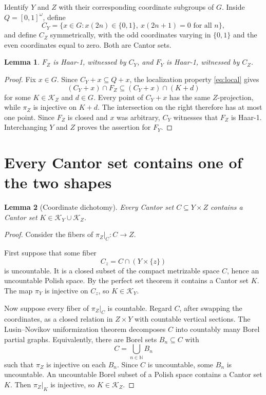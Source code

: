 \documentclass[11pt]{article}
\newtheorem{lemma}{Lemma}
\newcommand{\N}{\mathbb N}
\newcommand{\cK}{\mathscr K}
\begin{document}
Identify $Y$ and $Z$ with their corresponding coordinate subgroups of $G$.
Inside $Q=[0,1]^\omega$, define
\[
 C_Y=\{x\in G:x(2n)\in\{0,1\},\ x(2n+1)=0\text{ for all }n\},
\]
and define $C_Z$ symmetrically, with the odd coordinates varying in
$\{0,1\}$ and the even coordinates equal to zero.  Both are Cantor sets.

\begin{lemma}\label{lem:haar1}
$F_Z$ is Haar-1, witnessed by $C_Y$, and $F_Y$ is Haar-1, witnessed by $C_Z$.
\end{lemma}

\begin{proof}
Fix $x\in G$.  Since $C_Y+x\subseteq Q+x$, the localization property
\eqref{eq:local} gives
\[
 (C_Y+x)\cap F_Z\subseteq (C_Y+x)\cap(K+d)
\]
for some $K\in\cK_Z$ and $d\in G$.  Every point of $C_Y+x$ has the same
$Z$-projection, while $\pi_Z$ is injective on $K+d$.  The intersection on
the right therefore has at most one point.  Since $F_Z$ is closed and $x$
was arbitrary, $C_Y$ witnesses that $F_Z$ is Haar-1.  Interchanging $Y$ and
$Z$ proves the assertion for $F_Y$.
\end{proof}

\section{Every Cantor set contains one of the two shapes}

\begin{lemma}[Coordinate dichotomy]\label{lem:dichotomy}
Every Cantor set $C\subseteq Y\times Z$ contains a Cantor set
$K\in\cK_Y\cup\cK_Z$.
\end{lemma}

\begin{proof}
Consider the fibers of $\pi_Z|_C:C\to Z$.

First suppose that some fiber
\[
       C_z=C\cap(Y\times\{z\})
\]
is uncountable.  It is a closed subset of the compact metrizable space $C$,
hence an uncountable Polish space.  By the perfect set theorem it contains a
Cantor set $K$.  The map $\pi_Y$ is injective on $C_z$, so
$K\in\cK_Y$.

Now suppose every fiber of $\pi_Z|_C$ is countable.  Regard $C$, after
swapping the coordinates, as a closed relation in $Z\times Y$ with countable
vertical sections.  The Lusin--Novikov uniformization theorem decomposes
$C$ into countably many Borel partial graphs.  Equivalently, there are Borel
sets $B_n\subseteq C$ with
\[
                   C=\bigcup_{n\in\N}B_n
\]
such that $\pi_Z$ is injective on each $B_n$.  Since $C$ is uncountable, some
$B_n$ is uncountable.  An uncountable Borel subset of a Polish space contains
a Cantor set $K$.  Then $\pi_Z|_K$ is injective, so $K\in\cK_Z$.
\end{proof}
\end{document}
